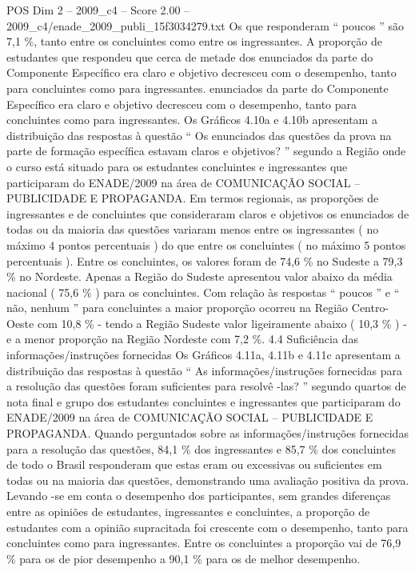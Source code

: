 \begin{textsample}{POS Dim 2 – 2009\_c4 – Score 2.00 – 2009\_c4/enade\_2009\_publi\_15f3034279.txt}
Os que responderam “ poucos ” são 7,1 \%, tanto entre os concluintes como entre os ingressantes.
A proporção de estudantes que respondeu que cerca de metade dos enunciados da parte do Componente Específico era claro e objetivo decresceu com o desempenho, tanto para concluintes como para ingressantes. enunciados da parte do Componente Específico era claro e objetivo decresceu com o desempenho, tanto para concluintes como para ingressantes.
Os Gráficos 4.10a e 4.10b apresentam a distribuição das respostas à questão “ Os enunciados das questões da prova na parte de formação específica estavam claros e objetivos? ” segundo a Região onde o curso está situado para os estudantes concluintes e ingressantes que participaram do ENADE/2009 na área de COMUNICAÇÃO SOCIAL – PUBLICIDADE E PROPAGANDA.
Em termos regionais, as proporções de ingressantes e de concluintes que consideraram claros e objetivos os enunciados de todas ou da maioria das questões variaram menos entre os ingressantes ( no máximo 4 pontos percentuais ) do que entre os concluintes ( no máximo 5 pontos percentuais ).
Entre os concluintes, os valores foram de 74,6 \% no Sudeste a 79,3 \% no Nordeste.
Apenas a Região do Sudeste apresentou valor abaixo da média nacional ( 75,6 \% ) para os concluintes.
Com relação às respostas “ poucos ” e “ não, nenhum ” para concluintes a maior proporção ocorreu na Região Centro-Oeste com 10,8 \% - tendo a Região Sudeste valor ligeiramente abaixo ( 10,3 \% ) - e a menor proporção na Região Nordeste com 7,2 \%. 4.4 Suficiência das informações/instruções fornecidas Os Gráficos 4.11a, 4.11b e 4.11c apresentam a distribuição das respostas à questão “ As informações/instruções fornecidas para a resolução das questões foram suficientes para resolvê -las? ” segundo quartos de nota final e grupo dos estudantes concluintes e ingressantes que participaram do ENADE/2009 na área de COMUNICAÇÃO SOCIAL – PUBLICIDADE E PROPAGANDA.
Quando perguntados sobre as informações/instruções fornecidas para a resolução das questões, 84,1 \% dos ingressantes e 85,7 \% dos concluintes de todo o Brasil responderam que estas eram ou excessivas ou suficientes em todas ou na maioria das questões, demonstrando uma avaliação positiva da prova.
Levando -se em conta o desempenho dos participantes, sem grandes diferenças entre as opiniões de estudantes, ingressantes e concluintes, a proporção de estudantes com a opinião supracitada foi crescente com o desempenho, tanto para concluintes como para ingressantes.
Entre os concluintes a proporção vai de 76,9 \% para os de pior desempenho a 90,1 \% para os de melhor desempenho.

\end{textsample}
